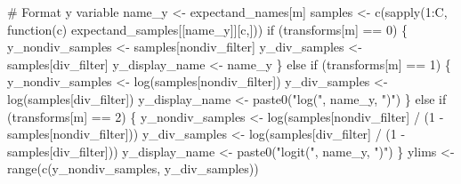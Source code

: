 \documentclass[
  letterpaper,
  DIV=11,
  numbers=noendperiod]{scrartcl}
\newenvironment{Shaded}{\begin{snugshade}}{\end{snugshade}}
\newcommand{\CommentTok}[1]{\textcolor[rgb]{0.37,0.37,0.37}{#1}}
\newcommand{\ControlFlowTok}[1]{\textcolor[rgb]{0.00,0.23,0.31}{#1}}
\newcommand{\DecValTok}[1]{\textcolor[rgb]{0.68,0.00,0.00}{#1}}
\newcommand{\FunctionTok}[1]{\textcolor[rgb]{0.28,0.35,0.67}{#1}}
\newcommand{\NormalTok}[1]{\textcolor[rgb]{0.00,0.23,0.31}{#1}}
\newcommand{\OtherTok}[1]{\textcolor[rgb]{0.00,0.23,0.31}{#1}}
\newcommand{\SpecialCharTok}[1]{\textcolor[rgb]{0.37,0.37,0.37}{#1}}
\newcommand{\StringTok}[1]{\textcolor[rgb]{0.13,0.47,0.30}{#1}}
\begin{document}
\begin{Shaded}
\begin{Highlighting}[]
      \CommentTok{\# Format y variable}
\NormalTok{      name\_y }\OtherTok{\textless{}{-}}\NormalTok{ expectand\_names[m]}
\NormalTok{      samples }\OtherTok{\textless{}{-}} \FunctionTok{c}\NormalTok{(}\FunctionTok{sapply}\NormalTok{(}\DecValTok{1}\SpecialCharTok{:}\NormalTok{C, }
                          \ControlFlowTok{function}\NormalTok{(c) expectand\_samples[[name\_y]][c,]))}
      \ControlFlowTok{if}\NormalTok{ (transforms[m] }\SpecialCharTok{==} \DecValTok{0}\NormalTok{) \{}
\NormalTok{        y\_nondiv\_samples }\OtherTok{\textless{}{-}}\NormalTok{ samples[nondiv\_filter]}
\NormalTok{        y\_div\_samples }\OtherTok{\textless{}{-}}\NormalTok{ samples[div\_filter]}
\NormalTok{        y\_display\_name }\OtherTok{\textless{}{-}}\NormalTok{ name\_y}
\NormalTok{      \} }\ControlFlowTok{else} \ControlFlowTok{if}\NormalTok{ (transforms[m] }\SpecialCharTok{==} \DecValTok{1}\NormalTok{) \{}
\NormalTok{        y\_nondiv\_samples }\OtherTok{\textless{}{-}} \FunctionTok{log}\NormalTok{(samples[nondiv\_filter])}
\NormalTok{        y\_div\_samples }\OtherTok{\textless{}{-}} \FunctionTok{log}\NormalTok{(samples[div\_filter])}
\NormalTok{        y\_display\_name }\OtherTok{\textless{}{-}} \FunctionTok{paste0}\NormalTok{(}\StringTok{"log("}\NormalTok{, name\_y, }\StringTok{")"}\NormalTok{)}
\NormalTok{      \} }\ControlFlowTok{else} \ControlFlowTok{if}\NormalTok{ (transforms[m] }\SpecialCharTok{==} \DecValTok{2}\NormalTok{) \{}
\NormalTok{        y\_nondiv\_samples }\OtherTok{\textless{}{-}} \FunctionTok{log}\NormalTok{(samples[nondiv\_filter] }\SpecialCharTok{/} 
\NormalTok{                                  (}\DecValTok{1} \SpecialCharTok{{-}}\NormalTok{ samples[nondiv\_filter]))}
\NormalTok{        y\_div\_samples }\OtherTok{\textless{}{-}} \FunctionTok{log}\NormalTok{(samples[div\_filter] }\SpecialCharTok{/}
\NormalTok{                               (}\DecValTok{1} \SpecialCharTok{{-}}\NormalTok{ samples[div\_filter]))}
\NormalTok{        y\_display\_name }\OtherTok{\textless{}{-}} \FunctionTok{paste0}\NormalTok{(}\StringTok{"logit("}\NormalTok{, name\_y, }\StringTok{")"}\NormalTok{)}
\NormalTok{      \}}
\NormalTok{      ylims }\OtherTok{\textless{}{-}} \FunctionTok{range}\NormalTok{(}\FunctionTok{c}\NormalTok{(y\_nondiv\_samples, y\_div\_samples))}
      

\end{Highlighting}
\end{Shaded}
\end{document}
